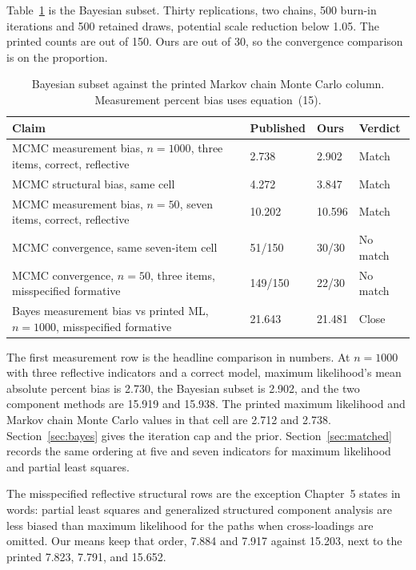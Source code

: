 \documentclass[11pt]{article}
\begin{document}
Table~\ref{tab:bayes} is the Bayesian subset. Thirty replications, two
chains, 500 burn-in iterations and 500 retained draws, potential scale
reduction below 1.05. The printed counts are out of 150. Ours are out of
30, so the convergence comparison is on the proportion.

\begin{table}[ht]
\centering
\caption{Bayesian subset against the printed Markov chain Monte Carlo
column. Measurement percent bias uses equation~(15).}
\label{tab:bayes}
\small
\begin{tabular}{@{}p{}p{}p{}p{}@{}}
\toprule
Claim & Published & Ours & Verdict \\
\midrule
MCMC measurement bias, $n=1000$, three items, correct, reflective & 2.738 & 2.902 & Match \\
MCMC structural bias, same cell & 4.272 & 3.847 & Match \\
MCMC measurement bias, $n=50$, seven items, correct, reflective & 10.202 & 10.596 & Match \\
MCMC convergence, same seven-item cell & 51/150 & 30/30 & No match \\
MCMC convergence, $n=50$, three items, misspecified formative & 149/150 & 22/30 & No match \\
Bayes measurement bias vs printed ML, $n=1000$, misspecified formative & 21.643 & 21.481 & Close \\
\bottomrule
\end{tabular}
\end{table}

The first measurement row is the headline comparison in numbers. At
$n=1000$ with three reflective indicators and a correct model, maximum
likelihood's mean absolute percent bias is 2.730, the Bayesian subset is
2.902, and the two component methods are 15.919 and 15.938. The printed
maximum likelihood and Markov chain Monte Carlo values in that cell are
2.712 and 2.738. Section~\ref{sec:bayes} gives the iteration cap and the
prior. Section~\ref{sec:matched} records the same ordering at five and
seven indicators for maximum likelihood and partial least squares.

The misspecified reflective structural rows are the exception Chapter~5
states in words: partial least squares and generalized structured component
analysis are less biased than maximum likelihood for the paths when
cross-loadings are omitted. Our means keep that order, 7.884 and 7.917
against 15.203, next to the printed 7.823, 7.791, and 15.652.
\end{document}
